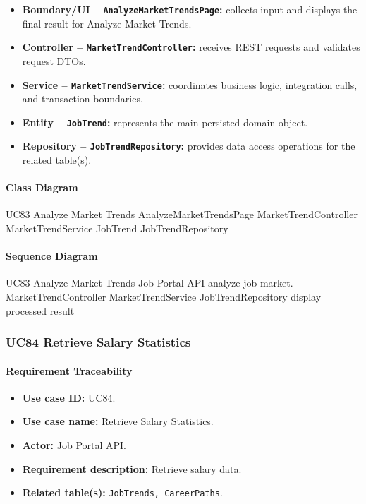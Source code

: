\begin{itemize}
    \item \textbf{Boundary/UI -- \texttt{AnalyzeMarketTrendsPage}:} collects input and displays the final result for Analyze Market Trends.
    \item \textbf{Controller -- \texttt{MarketTrendController}:} receives REST requests and validates request DTOs.
    \item \textbf{Service -- \texttt{MarketTrendService}:} coordinates business logic, integration calls, and transaction boundaries.
    \item \textbf{Entity -- \texttt{JobTrend}:} represents the main persisted domain object.
    \item \textbf{Repository -- \texttt{JobTrendRepository}:} provides data access operations for the related table(s).
\end{itemize}

\paragraph{Class Diagram}

\ClassDiagram
{UC83 Analyze Market Trends}
{AnalyzeMarketTrendsPage}
{MarketTrendController}
{MarketTrendService}
{JobTrend}
{JobTrendRepository}

\paragraph{Sequence Diagram}

\SequenceDiagram
{UC83 Analyze Market Trends}
{Job Portal API}
{analyze job market.}
{MarketTrendController}
{MarketTrendService}
{JobTrendRepository}
{display processed result}

\subsubsection{UC84 Retrieve Salary Statistics}

\paragraph{Requirement Traceability}

\begin{itemize}
    \item \textbf{Use case ID:} UC84.
    \item \textbf{Use case name:} Retrieve Salary Statistics.
    \item \textbf{Actor:} Job Portal API.
    \item \textbf{Requirement description:} Retrieve salary data.
    \item \textbf{Related table(s):} \texttt{JobTrends, CareerPaths}.
\end{itemize}

